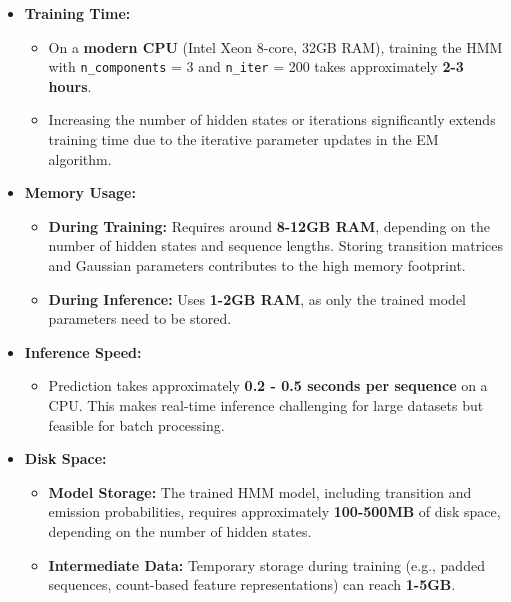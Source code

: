 \begin{itemize}
    \item \textbf{Training Time:}
    \begin{itemize}
    \item On a \textbf{modern CPU} (Intel Xeon 8-core, 32GB RAM), training the HMM with \texttt{n\_components} = 3 and \texttt{n\_iter} = 200 takes approximately \textbf{2-3 hours}.
    \item Increasing the number of hidden states or iterations significantly extends training time due to the iterative parameter updates in the EM algorithm.
    \end{itemize}
    
    \item \textbf{Memory Usage:}  
    \begin{itemize}
        \item \textbf{During Training:} Requires around \textbf{8-12GB RAM}, depending on the number of hidden states and sequence lengths. Storing transition matrices and Gaussian parameters contributes to the high memory footprint.  
        \item \textbf{During Inference:} Uses \textbf{1-2GB RAM}, as only the trained model parameters need to be stored.
    \end{itemize}
    
    \item \textbf{Inference Speed:}  
    \begin{itemize}
        \item Prediction takes approximately \textbf{0.2 - 0.5 seconds per sequence} on a CPU. This makes real-time inference challenging for large datasets but feasible for batch processing.  
    \end{itemize}
    
    \item \textbf{Disk Space:}  
    \begin{itemize}
        \item \textbf{Model Storage:} The trained HMM model, including transition and emission probabilities, requires approximately \textbf{100-500MB} of disk space, depending on the number of hidden states.
        \item \textbf{Intermediate Data:} Temporary storage during training (e.g., padded sequences, count-based feature representations) can reach \textbf{1-5GB}.
    \end{itemize}
\end{itemize}
    

